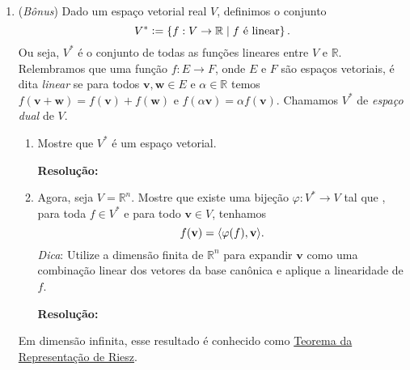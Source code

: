 \documentclass[leqno]{article}
\numberwithin{equation}{section}
\DeclarePairedDelimiter{\dotprod}{\langle}{\rangle}
\newcommand{\defeq}{\vcentcolon=}
\newcommand{\bfw}{\mathbf{w}}
\newcommand{\bfv}{\mathbf{v}}
\newcommand{\R}{\mathbb{R}}
\newenvironment{sol}
{
    \vspace{4mm}
    \noindent\textbf{Resolução:}
    \strut\newline
    \smallskip
    \hspace{-3.5mm}
}
{}
\begin{document}
\begin{enumerate}
	\begin{sol} 
	\end{sol} 

    \item (\textit{Bônus}) Dado um espaço vetorial real \( V \), definimos o conjunto
        \begin{equation*}
            V^{ * } \defeq \left\{ f : V \to \R \mid f \text{ é linear} \right\}
        .\end{equation*}
        Ou seja, \( V^{ * } \) é o conjunto de todas as funções lineares entre \( V \) e \( \R \).
        Relembramos que uma função \( f : E \to F \), onde \( E \) e \( F \) são espaços vetoriais, é dita \textit{linear} se para todos \( \bfv, \bfw \in E \) e \( \alpha \in \R \) temos \( f ( \bfv + \bfw ) = f ( \bfv ) + f ( \bfw ) \) e \( f ( \alpha \bfv ) = \alpha f ( \bfv ) \).
        Chamamos \( V^{ * } \) de \textit{espaço dual} de \( V \).
        \begin{enumerate}
            \item Mostre que \( V^{ * } \) é um espaço vetorial.
	
		\begin{sol} 
		\end{sol} 

            \item Agora, seja \( V = \R^{ n } \).
                Mostre que existe uma bijeção \( \varphi : V^{ * } \to V \) tal que , para toda \( f \in V^{ * } \) e para todo \( \bfv \in V \), tenhamos
                \begin{equation*}
                    f(\bfv) = \dotprod{\varphi(f), \bfv}
                .\end{equation*}
                \textit{Dica}: Utilize a dimensão finita de \( \R^{ n } \) para expandir \( \bfv \) como uma combinação linear dos vetores da base canônica e aplique a linearidade de \( f \).

		\begin{sol} 
		\end{sol} 
        \end{enumerate}
        Em dimensão infinita, esse resultado é conhecido como \href{https://en.wikipedia.org/wiki/Riesz_representation_theorem}{Teorema da Representação de Riesz}.
\end{enumerate}
\end{document}
